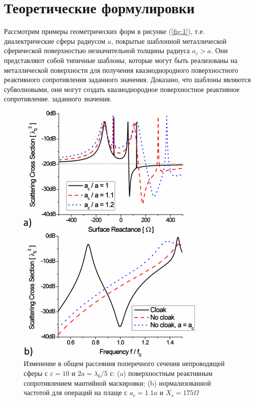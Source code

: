 \documentclass[12pt,a4paper]{article}
\begin{document}
\section{Теоретические формулировки}
Рассмотрим примеры геометрических форм в рисунке (\ref{fig:1}), т.е. диалектрические сферы 
радиусом $a$,
покрытые шаблонной металлической сферической поверхностью незначительной толщины радиуса $
a_c > a$.
Они представляют собой типичные шаблоны, которые могут быть реализованы на металлической поверхности
для получения квазиоднородного поверхностного реактивного сопротивления заданного значения. Доказано, что
шаблоны являются субволновыми, они могут создать квазиоднородное поверхностное реактивное сопротивление.
заданного значения.

\begin{figure}[t]
  \centering
  \includegraphics[height=0.3\paperheight, width=0.4\paperwidth]{2.png}
  \caption{Изменение в общем рассеяния поперечного сечения непроводящей сферы с $\varepsilon
  =10$ и $2a=\lambda_0/5$ с: (a) поверхностным реактивным сопротивлением мантийной маскировки; (b)
  нормализованной частотой для операций на плаще с $a_c=1.1a$ и $X_s=175\Omega$}
  \label{fig:2}
\end{figure}
\end{document}
